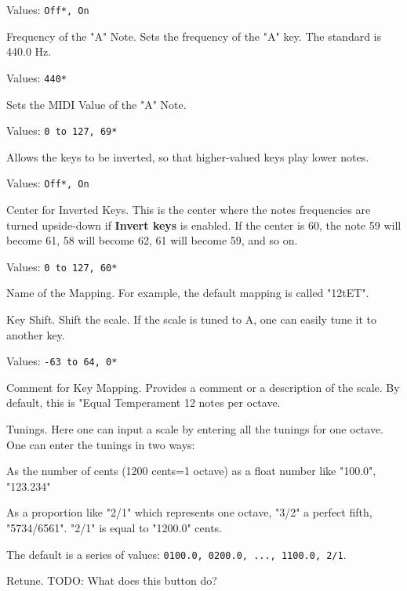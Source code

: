    Values: \texttt{Off*, On}

   Frequency of the "A" Note.
   Sets the frequency of the "A" key. The standard is 440.0 Hz.

   Values: \texttt{440*}

   Sets the MIDI Value of the "A" Note.

   Values: \texttt{0 to 127, 69*}

   Allows the keys to be inverted, so that higher-valued keys play lower
   notes.

   Values: \texttt{Off*, On}

   Center for Inverted Keys.
   This is the center where the notes frequencies are turned upside-down if
   \textbf{Invert keys} is enabled.
   If the center is 60, the note 59 will become 61, 58 will become 62, 61
   will become 59, and so on.

   Values: \texttt{0 to 127, 60*}

   Name of the Mapping.
   For example, the default mapping is called "12tET".

   Key Shift.
   Shift the scale. If the scale is tuned to A, one can easily tune it to
   another key.

   Values: \texttt{-63 to 64, 0*}

   Comment for Key Mapping.
   Provides a comment or a description of the scale.
   By default, this is "Equal Temperament 12 notes per octave.

   Tunings.
   Here one can input a scale by entering all the tunings for one octave. 
   One can enter the tunings in two ways: 

   \begin{enumber}
      \item As the number of cents (1200 cents=1 octave) as a float number
      like "100.0", "123.234"
      \item As a proportion like "2/1" which represents one octave, "3/2" a
      perfect fifth, "5734/6561".  "2/1" is equal to "1200.0" cents.
   \end{enumber}

   The default is a series of values:
   \texttt{0100.0, 0200.0, ..., 1100.0, 2/1}.

   Retune.
   TODO:  What does this button do?

